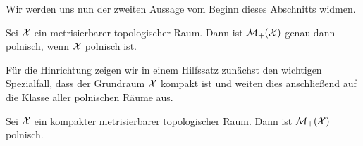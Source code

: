 \documentclass[../thesis/thesis.tex]{subfiles}
\begin{document}
	Wir werden uns nun der zweiten Aussage vom Beginn dieses Abschnitts widmen. 
	
	\begin{Satz}
		\label{satz:übertragung_polnizität}
		Sei $\mathcal{X}$ ein metrisierbarer topologischer Raum. Dann ist $\mathcal{M}_{+}(\mathcal{X})$ genau dann polnisch, wenn $\mathcal{X}$ polnisch ist.
	\end{Satz}
	
	Für die Hinrichtung zeigen wir in einem Hilfssatz zunächst den wichtigen Spezialfall, dass der Grundraum $\mathcal{X}$ kompakt ist und weiten dies anschließend auf die Klasse aller polnischen Räume aus.

	\begin{Hilfssatz}
		\label{hilfssatz:übertragung_polnizität_kompakter_grundraum}
		Sei $\mathcal{X}$ ein kompakter metrisierbarer topologischer Raum. Dann ist $\mathcal{M}_{+}(\mathcal{X})$ polnisch.
	\end{Hilfssatz}
	
\end{document}
